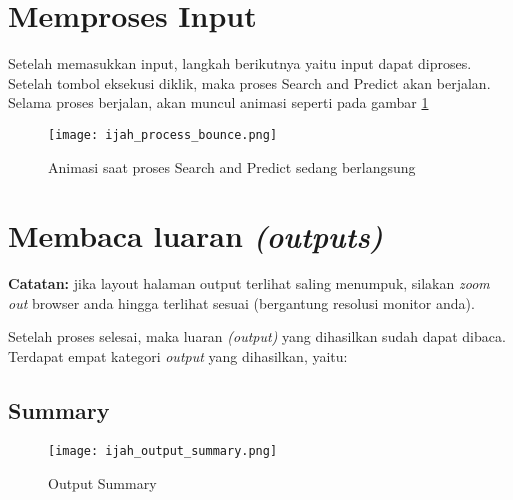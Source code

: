 \section{Memproses Input} \label{process}
Setelah memasukkan input, langkah berikutnya yaitu input dapat diproses. Setelah tombol eksekusi diklik, maka proses Search and Predict akan berjalan. Selama proses berjalan, akan muncul animasi seperti pada gambar \ref{fig:ijah_process_bounce}

\begin{figure}[H]
	\centering
	\texttt{[image: ijah\_process\_bounce.png]}
	\caption{Animasi saat proses Search and Predict sedang berlangsung}
	\label{fig:ijah_process_bounce}
	\end{figure}

\section{Membaca luaran \emph{(outputs)}}
\textbf{Catatan:} jika layout halaman output terlihat saling menumpuk, silakan \emph{zoom out} browser anda hingga terlihat sesuai (bergantung resolusi monitor anda).

Setelah proses selesai, maka luaran \emph{(output)} yang dihasilkan sudah dapat dibaca. Terdapat empat kategori \emph{output} yang dihasilkan, yaitu:
	
	\subsection{Summary} \label{summary}
	\begin{figure}[H]
	\centering
	\texttt{[image: ijah\_output\_summary.png]}
	\caption{Output Summary}
	\label{fig:ijah_output_summary}
	\end{figure}
	
